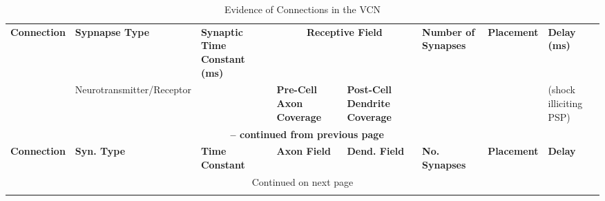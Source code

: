 \begin{longtable}{cXXXXXXX}%
%
\caption{Evidence of Connections in the VCN}\label{tab:Connections} \\
\toprule  {\textbf{Connection}} & {\textbf{Sypnapse Type}} & {\textbf{Synaptic Time Constant (ms)}} & \multicolumn{2}{c}{\textbf{Receptive Field}} & {\textbf{Number of Synapses}} & {\textbf{Placement}} & {\textbf{Delay (ms)}}\\
&\small{Neurotransmitter\slash Receptor}&& \small{\textbf{Pre-Cell Axon Coverage}} & \small{\textbf{Post-Cell Dendrite Coverage}} &&& \small{(shock illiciting PSP)} \\ \midrule 
\endfirsthead

\multicolumn{8}{c}{{\bfseries \tablename\ \thetable{} -- continued from previous page}} \\
\midrule {\textbf{Connection}} & {\textbf{Syn. Type}} & {\textbf{Time Constant}} & {\textbf{Axon Field}}& {\textbf{Dend. Field}} & {\textbf{No. Synapses}} & {\textbf{Placement}} & {\textbf{Delay}} \\ \midrule 
\endhead

\midrule \multicolumn{8}{c}{{Continued on next page}} \\ %
\endfoot
\bottomrule
\endlastfoot


\end{longtable}
